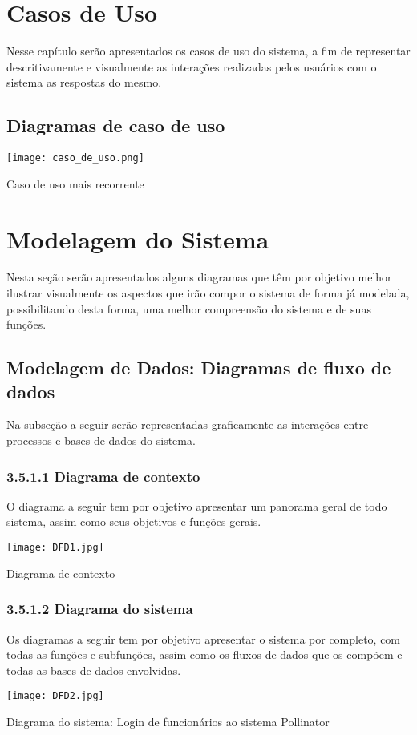 \section{ Casos de Uso}
Nesse capítulo serão apresentados os casos de uso do sistema, a fim de representar descritivamente e visualmente as interações realizadas pelos usuários com o sistema as respostas do mesmo.
\subsection{Diagramas de caso de uso}
\begin{table}[H]
	    \begin{center}
	    \texttt{[image: caso\_de\_uso.png]}
	    \caption{Caso de uso mais recorrente} \label{tab:casoUso}
	    \end{center}
\end{table} 

\section{Modelagem do Sistema}
Nesta seção serão apresentados alguns diagramas que têm por objetivo melhor ilustrar visualmente os aspectos que irão compor o sistema de forma já modelada, possibilitando desta forma, uma melhor compreensão do sistema e de suas funções.
\subsection{Modelagem de Dados: Diagramas de fluxo de dados}
Na subseção a seguir serão representadas graficamente as interações entre processos e bases de dados do sistema. 

	\subsubsection{3.5.1.1 Diagrama de contexto}
	 O diagrama a seguir tem por objetivo apresentar um panorama geral de todo sistema, assim como seus objetivos e funções gerais.
	 \begin{table}[H]
	 \begin{center}
	    \texttt{[image: DFD1.jpg]}
	    \caption{Diagrama de contexto} \label{tab:DFD1}
	 \end{center}
	 \end{table} 
	\subsubsection{3.5.1.2 Diagrama do sistema}
 Os diagramas a seguir tem por objetivo apresentar o sistema por completo, com todas as funções e subfunções, assim como os fluxos de dados que os compõem e todas as bases de dados envolvidas.
 	\begin{table}[H]
	 \begin{center}
	    \texttt{[image: DFD2.jpg]}
	    \caption{Diagrama do sistema: Login de funcionários ao sistema Pollinator } \label{tab:DFD2}
	 \end{center}
	 \end{table} 
	 
